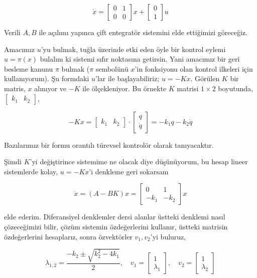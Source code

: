 \documentclass[12pt,fleqn]{article}\usepackage{../../common}
\begin{document}
$$ 
\dot{x} = \left[\begin{array}{rr}
0 & 1 \\ 0 & 0
\end{array}\right] x + 
\left[\begin{array}{c} 0 \\ 1 \end{array}\right] u
$$

Verili $A,B$ ile açılımı yapınca çift entegratör sistemini elde ettiğimizi
göreceğiz.

Amacımız $u$'yu bulmak, tuğla üzerinde etki eden öyle bir kontrol eylemi
$u = \pi(x)$ bulalım ki sistemi sıfır noktasına getirsin. Yani amacımız bir
geri besleme kanunu $\pi$ bulmak ($\pi$ sembolünü $x$'in fonksiyonu olan
kontrol ilkeleri için kullanıyorum). Şu formdaki $u$'lar ile
başlayabiliriz; $u = -K x$. Görülen $K$ bir matris, $x$ alınıyor ve $-K$
ile ölçekleniyor. Bu örnekte $K$ matrisi $1 \times 2$ boyutunda,
$\left[\begin{array}{cc} k_1 & k_2 \end{array}\right]$,

$$ 
-K x = 
\left[\begin{array}{cc} k_1 & k_2 \end{array}\right] 
\cdot
\left[\begin{array}{cc} q \\ \dot{q} \end{array}\right] =
-k_1 q - k_2 \dot{q}
$$

Bazılarımız bir formu orantılı türevsel kontrolör olarak tanıyacaktır. 

Şimdi $K$'yi değiştirince sistemime ne olacak diye düşünüyorum, bu hesap
lineer sistemlerde kolay, $u = -Kx$'i denkleme geri sokarsam 

$$ 
\dot{x} = (A - BK)x = \left[\begin{array}{rr}
0 & 1 \\ -k_1 & -k_2
\end{array}\right] x
$$

elde ederim. Diferansiyel denklemler dersi alanlar üstteki denklemi nasıl
çözeceğimizi bilir, çözüm sistemin özdeğerlerini kullanır, üstteki matrisin
özdeğerlerini hesaplarız, sonra özvektörler $v_1,v_2$'yi buluruz,

$$ 
\lambda_{1,2} = \frac{-k_2 \pm \sqrt{k_2^2 - 4 k_1}}{2}, \quad
v_1 = \left[\begin{array}{r}
1 \\ \lambda_1
\end{array}\right], \quad 
v_2 = \left[\begin{array}{r}
1 \\ \lambda_2
\end{array}\right]
$$
\end{document}
